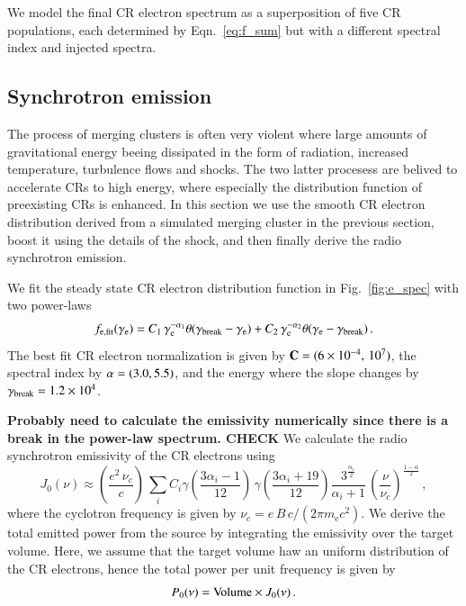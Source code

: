 \documentclass[useAMS,usenatbib]{mn2e}
\def\C#1{{\bf #1}}
\newcommand{\e}{\mathrm{e}}
\newcommand{\mecc}{m_\e c^2}
\newcommand{\gam}{\gamma}
\begin{document}
We model the final CR electron spectrum as a superposition of five CR
populations, each determined by Eqn.~\ref{eq:f_sum} but with a
different spectral index and injected spectra. 


\subsection{Synchrotron emission}
The process of merging clusters is often very violent where large
amounts of gravitational energy beeing dissipated in the form of
radiation, increased temperature, turbulence flows and shocks. The two
latter procesess are belived to accelerate CRs to high energy, where
especially the distribution function of preexisting CRs is
enhanced. In this section we use the smooth CR electron distribution
derived from a simulated merging cluster in the previous section,
boost it using the details of the shock, and then finally derive the
radio synchrotron emission.

We fit the steady state CR electron distribution function in
Fig.~\ref{fig:e_spec} with two power-laws
\begin{equation}
  f_\rmn{e,fit}(\gam_\e) = C_1\,\gam_\e^{-\alpha_1}
\theta(\gam_\rmn{break}-\gam_\e) 
+ C_2\,\gam_\e^{-\alpha_2}
\theta(\gam_\e-\gam_\rmn{break})\,. 
\label{eq:f_fit}
\end{equation}
The best fit CR electron normalization is given by ${\bf
  C}=(6\times10^{-4},\,10^{7})$, the spectral index by ${\bf
  \alpha}=(3.0,5.5)$, and the energy where the slope changes by
$\gam_\rmn{break}=1.2\times10^4$.

\C{Probably need to calculate the emissivity numerically since there
  is a break in the power-law spectrum. CHECK} We calculate the radio
synchrotron emissivity of the CR electrons using \cite{1979rpa..book.....R}
\begin{equation}
J_0(\nu) \approx \left(\frac{e^2\,\nu_c}{c}\right)\,\sum_i C_i
\gam\left(\frac{3 \alpha_i-1}{12}\right)\,\gam\left(\frac{3 \alpha_i+19}{12}\right)\frac{3^\frac{\alpha_i}{2}}{\alpha_i+1}\,\left(\frac{\nu}{\nu_c}\right)^{\frac{1-\alpha}{2}}\,,
\end{equation}
where the cyclotron frequency is given by
$\nu_c=e\,B\,c/(2\pi\mecc)$. We derive the total emitted power from
the source by integrating the emissivity over the target volume. Here,
we assume that the target volume haw an uniform distribution of the
CR electrons, hence the total power per unit frequency is given by
\begin{equation}
  P_0(\nu) = {\mathrm{Volume}} \times J_0(\nu)\,.
\end{equation}
\end{document}
